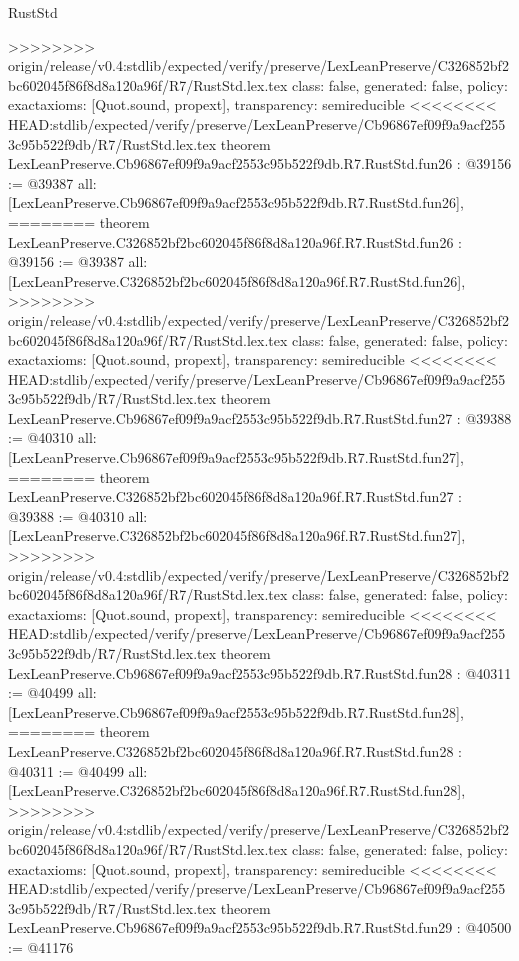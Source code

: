 \begin{lexlean}{RustStd}
\begin{coremodule}
{\begin{coremodule}
{{{{{{{{{{{{{{{{{{{{{{{{{{{{{>>>>>>>> origin/release/v0.4:stdlib/expected/verify/preserve/LexLeanPreserve/C326852bf2bc602045f86f8d8a120a96f/R7/RustStd.lex.tex
  class: false,
  generated: false,
  policy: exact{axioms: [Quot.sound, propext]},
  transparency: semireducible
}
<<<<<<<< HEAD:stdlib/expected/verify/preserve/LexLeanPreserve/Cb96867ef09f9a9acf2553c95b522f9db/R7/RustStd.lex.tex
theorem LexLeanPreserve.Cb96867ef09f9a9acf2553c95b522f9db.R7.RustStd.fun26 : @39156 := @39387 {
  all: [LexLeanPreserve.Cb96867ef09f9a9acf2553c95b522f9db.R7.RustStd.fun26],
========
theorem LexLeanPreserve.C326852bf2bc602045f86f8d8a120a96f.R7.RustStd.fun26 : @39156 := @39387 {
  all: [LexLeanPreserve.C326852bf2bc602045f86f8d8a120a96f.R7.RustStd.fun26],
>>>>>>>> origin/release/v0.4:stdlib/expected/verify/preserve/LexLeanPreserve/C326852bf2bc602045f86f8d8a120a96f/R7/RustStd.lex.tex
  class: false,
  generated: false,
  policy: exact{axioms: [Quot.sound, propext]},
  transparency: semireducible
}
<<<<<<<< HEAD:stdlib/expected/verify/preserve/LexLeanPreserve/Cb96867ef09f9a9acf2553c95b522f9db/R7/RustStd.lex.tex
theorem LexLeanPreserve.Cb96867ef09f9a9acf2553c95b522f9db.R7.RustStd.fun27 : @39388 := @40310 {
  all: [LexLeanPreserve.Cb96867ef09f9a9acf2553c95b522f9db.R7.RustStd.fun27],
========
theorem LexLeanPreserve.C326852bf2bc602045f86f8d8a120a96f.R7.RustStd.fun27 : @39388 := @40310 {
  all: [LexLeanPreserve.C326852bf2bc602045f86f8d8a120a96f.R7.RustStd.fun27],
>>>>>>>> origin/release/v0.4:stdlib/expected/verify/preserve/LexLeanPreserve/C326852bf2bc602045f86f8d8a120a96f/R7/RustStd.lex.tex
  class: false,
  generated: false,
  policy: exact{axioms: [Quot.sound, propext]},
  transparency: semireducible
}
<<<<<<<< HEAD:stdlib/expected/verify/preserve/LexLeanPreserve/Cb96867ef09f9a9acf2553c95b522f9db/R7/RustStd.lex.tex
theorem LexLeanPreserve.Cb96867ef09f9a9acf2553c95b522f9db.R7.RustStd.fun28 : @40311 := @40499 {
  all: [LexLeanPreserve.Cb96867ef09f9a9acf2553c95b522f9db.R7.RustStd.fun28],
========
theorem LexLeanPreserve.C326852bf2bc602045f86f8d8a120a96f.R7.RustStd.fun28 : @40311 := @40499 {
  all: [LexLeanPreserve.C326852bf2bc602045f86f8d8a120a96f.R7.RustStd.fun28],
>>>>>>>> origin/release/v0.4:stdlib/expected/verify/preserve/LexLeanPreserve/C326852bf2bc602045f86f8d8a120a96f/R7/RustStd.lex.tex
  class: false,
  generated: false,
  policy: exact{axioms: [Quot.sound, propext]},
  transparency: semireducible
}
<<<<<<<< HEAD:stdlib/expected/verify/preserve/LexLeanPreserve/Cb96867ef09f9a9acf2553c95b522f9db/R7/RustStd.lex.tex
theorem LexLeanPreserve.Cb96867ef09f9a9acf2553c95b522f9db.R7.RustStd.fun29 : @40500 := @41176 {
}}}}}}}}}}}}}}}}}}}}}}}}}}}}}}}}
\end{coremodule}}
\end{coremodule}
\end{lexlean}

